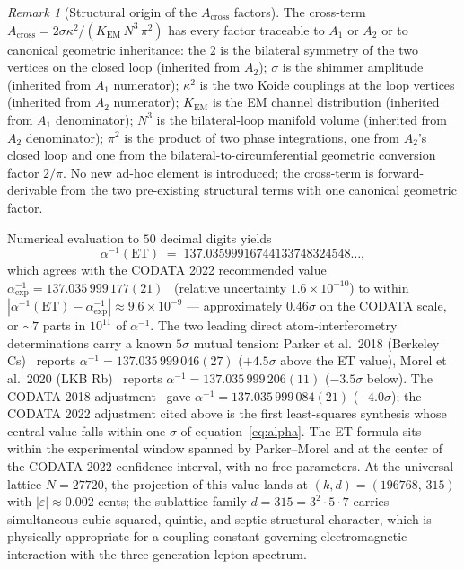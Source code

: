 \documentclass[11pt,a4paper]{article}
\theoremstyle{definition}
\theoremstyle{remark}
\newtheorem{remark}[theorem]{Remark}
\newcommand{\eps}{\varepsilon}
\begin{document}
\begin{remark}[Structural origin of the $A_{\mathrm{cross}}$ factors]\label{rem:Across-factors}
The cross-term $A_{\mathrm{cross}} = 2\sigma\kappa^{2}/(K_{\mathrm{EM}}\,N^{3}\,\pi^{2})$ has every factor traceable to $A_{1}$ or $A_{2}$ or to canonical geometric inheritance: the $2$ is the bilateral symmetry of the two vertices on the closed loop (inherited from $A_{2}$); $\sigma$ is the shimmer amplitude (inherited from $A_{1}$ numerator); $\kappa^{2}$ is the two Koide couplings at the loop vertices (inherited from $A_{2}$ numerator); $K_{\mathrm{EM}}$ is the EM channel distribution (inherited from $A_{1}$ denominator); $N^{3}$ is the bilateral-loop manifold volume (inherited from $A_{2}$ denominator); $\pi^{2}$ is the product of two phase integrations, one from $A_{2}$'s closed loop and one from the bilateral-to-circumferential geometric conversion factor $2/\pi$. No new ad-hoc element is introduced; the cross-term is forward-derivable from the two pre-existing structural terms with one canonical geometric factor.
\end{remark}

Numerical evaluation to $50$ decimal digits yields
\[
\alpha^{-1}(\mathrm{ET}) \;=\; 137.03599916744133748324548\ldots,
\]
which agrees with the CODATA 2022 recommended value $\alpha^{-1}_{\mathrm{exp}} = 137.035\,999\,177(21)$~\cite{CODATA2022} (relative uncertainty $1.6\times 10^{-10}$) to within $|\alpha^{-1}(\mathrm{ET}) - \alpha^{-1}_{\mathrm{exp}}| \approx 9.6\times 10^{-9}$ --- approximately $0.46\sigma$ on the CODATA scale, or $\sim 7$ parts in $10^{11}$ of $\alpha^{-1}$. The two leading direct atom-interferometry determinations carry a known $5\sigma$ mutual tension: Parker et al.~2018 (Berkeley Cs)~\cite{Parker2018} reports $\alpha^{-1} = 137.035\,999\,046(27)$ ($+4.5\sigma$ above the ET value), Morel et al.~2020 (LKB Rb)~\cite{Morel2020} reports $\alpha^{-1} = 137.035\,999\,206(11)$ ($-3.5\sigma$ below). The CODATA 2018 adjustment~\cite{CODATA2018} gave $\alpha^{-1} = 137.035\,999\,084(21)$ ($+4.0\sigma$); the CODATA 2022 adjustment cited above is the first least-squares synthesis whose central value falls within one $\sigma$ of equation~\eqref{eq:alpha}. The ET formula sits within the experimental window spanned by Parker--Morel and at the center of the CODATA 2022 confidence interval, with no free parameters. At the universal lattice $N=27720$, the projection of this value lands at $(k,d)=(196768,\,315)$ with $|\eps|\approx 0.002$ cents; the sublattice family $d=315 = 3^{2}\cdot 5\cdot 7$ carries simultaneous cubic-squared, quintic, and septic structural character, which is physically appropriate for a coupling constant governing electromagnetic interaction with the three-generation lepton spectrum.
\end{document}
